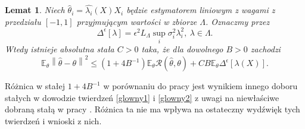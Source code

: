 \documentclass{mwart}
\newtheorem{lm}{Lemat}
\newcommand{\norm}[1]{\left\lVert#1\right\rVert}
\begin{document}
\begin{lm}\label{lem3}
Niech $\hat{\theta}_i=\hat{\lambda_i}(X)X_i$ będzie estymatorem liniowym z wagami z przedziału $[-1,1]$ przyjmującym wartości w zbiorze $\Lambda$. Oznaczmy przez 
\begin{displaymath}
\Delta^{\epsilon}[\lambda]=\epsilon^2L_{\Lambda}\sup_i\sigma_i^2\lambda_i^2,\ \lambda\in \Lambda.
\end{displaymath}
Wtedy istnieje absolutna stała $C>0$ taka, że dla dowolnego $B>0$ zachodzi
\begin{displaymath}
\mathbb{E}_{\theta}\norm{\hat{\theta}-\theta}^2\leq (1+4B^{-1})\mathbb{E}_{\theta}\mathcal{R}(\hat{\theta},\theta)+CB\mathbb{E}_{\theta}\Delta^{\epsilon}[\lambda (X)].
\end{displaymath}
\end{lm}
Różnica w stałej $1+4B^{-1}$ w porównaniu do pracy \cite{cavalier1} jest wynikiem innego doboru stałych w dowodzie twierdzeń \ref{glowny1} i \ref{glowny2} z uwagi na niewłaściwe dobraną stałą w pracy \cite{cavalier1}. Różnica ta nie ma wpływa na ostateczny wydźwięk tych twierdzeń i wnioski z nich.
\end{document}
